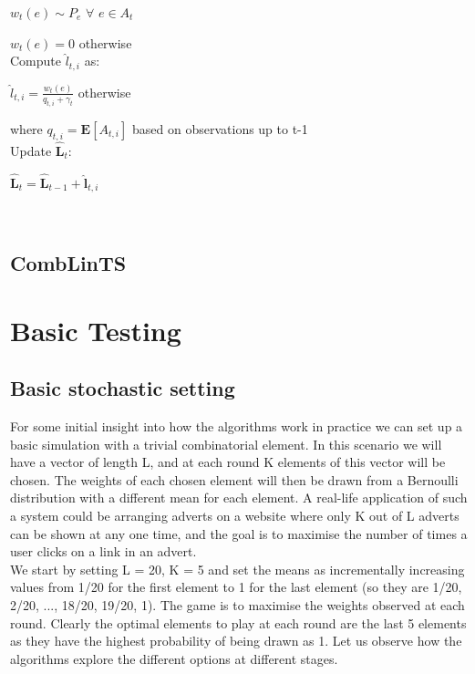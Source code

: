 \indent \indent $w_t(e) \sim P_e$ $\forall$ $e \in A_t$

\indent \indent $w_t(e)=0$ otherwise\\

Compute $\hat{l}_{t,i}$ as:

\indent \indent $\hat{l}_{t,i}=\frac{w_t(e)}{q_{t,i}+\gamma_t}$ otherwise

\indent \indent where $q_{t,i}=\textbf{E}[A_{t,i}]$ based on observations up to t-1\\

Update $\mathbf{\hat{L}}_t$:

\indent \indent $\mathbf{\hat{L}}_t=\mathbf{\hat{L}}_{t-1}+\mathbf{\hat{l}}_{t,i}$

\noindent \hrulefill\\


\subsection{CombLinTS}




\pagebreak


\section{Basic Testing}

\subsection{Basic stochastic setting}

For some initial insight into how the algorithms work in practice we can set up a basic simulation with a trivial combinatorial element. In this scenario we will have a vector of length L, and at each round K elements of this vector will be chosen. The weights of each chosen element will then be drawn from a Bernoulli distribution with a different mean for each element. A real-life application of such a system could be arranging adverts on a website where only K out of L adverts can be shown at any one time, and the goal is to maximise the number of times a user clicks on a link in an advert.\\

We start by setting L = 20, K = 5 and set the means as incrementally increasing values from 1/20 for the first element to 1 for the last element (so they are 1/20, 2/20, ..., 18/20, 19/20, 1). The game is to maximise the weights observed at each round. Clearly the optimal elements to play at each round are the last 5 elements as they have the highest probability of being drawn as 1. Let us observe how the algorithms explore the different options at different stages.\\


